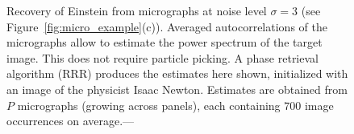 \documentclass[english,11pt]{article}
\newcommand{\1}{\mathbf{1}}
\newcommand{\TODO}[1]{{\color{red}{[#1]}}}
\numberwithin{equation}{section}
\theoremstyle{plain}
\theoremstyle{definition}
\theoremstyle{remark}
\theoremstyle{plain}
\theoremstyle{remark}
\theoremstyle{plain}
\theoremstyle{plain}
\newcommand{\SNR}{\ensuremath{\textsf{SNR}}}
\begin{document}
\begin{figure}[h!]

	\caption{\label{fig:Einst_example} Recovery of Einstein from micrographs at noise level $\sigma = 3$ (see Figure~\ref{fig:micro_example}(c)). Averaged autocorrelations of the micrographs allow to estimate the power spectrum of the target image. This does not require particle picking. A phase retrieval algorithm (RRR) produces the estimates here shown, initialized with an image of the physicist Isaac Newton. Estimates are obtained from $P$ micrographs (growing across panels), each containing $700$ image occurrences on average.---\TODO{Will add image with $P=512\times 10^4$ and image of Newton.}
	}
\end{figure}
\end{document}
